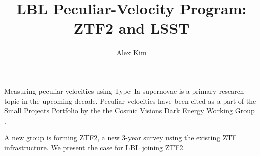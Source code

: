 \documentclass[11pt, oneside]{article}   	%
\title{LBL Peculiar-Velocity Program: ZTF2 and LSST}
\author{Alex Kim}
\begin{document}
\maketitle


Measuring peculiar velocities using Type~Ia supernovae is a primary research topic in the upcoming decade.  Peculiar velocities have
been cited as a part of the   Small Projects Portfolio  by the the Cosmic Visions Dark Energy Working Group \citep{2018arXiv180207216D}.

A new group is forming ZTF2, a new 3-year survey using the existing ZTF infrastructure.  We present the case for LBL joining ZTF2.














\end{document}

